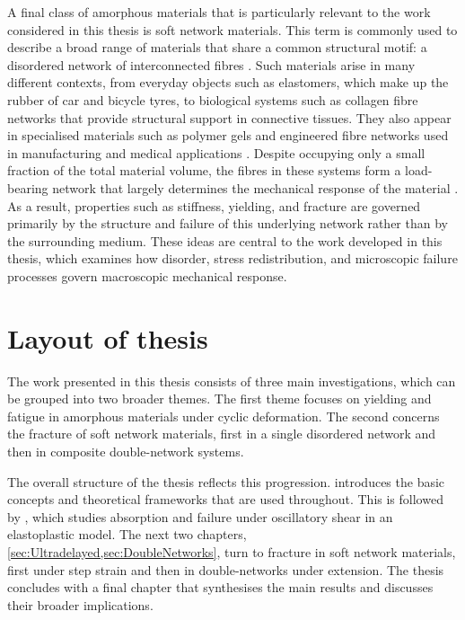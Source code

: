 A final class of amorphous materials that is particularly relevant to the work considered in this thesis is soft network materials. This term is commonly used to describe a broad range of materials that share a common structural motif: a disordered network of interconnected fibres \cite{tauber_microscopic_2020,gong_why_2010,tanaka_determination_2005,biotTheoryFiniteDeformations1972,mackintosh_elasticity_1995,Arevalo_Stress_Heterogeneities_2015}. Such materials arise in many different contexts, from everyday objects such as elastomers, which make up the rubber of car and bicycle tyres, to biological systems such as collagen fibre networks that provide structural support in connective tissues. They also appear in specialised materials such as polymer gels and engineered fibre networks used in manufacturing and medical applications \cite{yasudaNovelDoubleNetworkHydrogel2009,yinSelfHealingHydrogelsSynthesis2023,hoHydrogelsPropertiesApplications2022}. Despite occupying only a small fraction of the total material volume, the fibres in these systems form a load-bearing network that largely determines the mechanical response of the material \cite{Bonamy2011,sharma_strain-controlled_2016,Arevalo2015}. As a result, properties such as stiffness, yielding, and fracture are governed primarily by the structure and failure of this underlying network rather than by the surrounding medium. These ideas are central to the work developed in this thesis, which examines how disorder, stress redistribution, and microscopic failure processes govern macroscopic mechanical response.

\newpage
\section{Layout of thesis}

The work presented in this thesis consists of three main investigations, which can be grouped into two broader themes. The first theme focuses on yielding and fatigue in amorphous materials under cyclic deformation. The second concerns the fracture of soft network materials, first in a single disordered network and then in composite double-network systems. 

The overall structure of the thesis reflects this progression.  introduces the basic concepts and theoretical frameworks that are used throughout. This is followed by , which studies absorption and failure under oscillatory shear in an elastoplastic model. The next two chapters, \cref{sec:Ultradelayed,sec:DoubleNetworks}, turn to fracture in soft network materials, first under step strain and then in double-networks under extension. The thesis concludes with a final chapter that synthesises the main results and discusses their broader implications.

